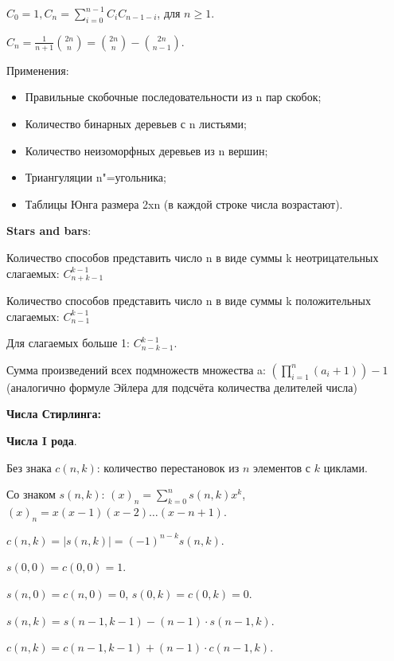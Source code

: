 $C_0 = 1, C_n = \sum_{i=0}^{n-1}C_i C_{n-1-i}$, для $n \ge 1$.

$C_n = \frac{1}{n+1}\binom{2n}{n} = \binom{2n}{n} - \binom{2n}{n - 1}$.

Применения:
\begin{itemize}
	\item Правильные скобочные последовательности из n пар скобок;
	\item Количество бинарных деревьев с n листьями;
	\item Количество неизоморфных деревьев из n вершин;
	\item Триангуляции n"=угольника;
	\item Таблицы Юнга размера 2xn (в каждой строке числа возрастают).
\end{itemize}
\textbf{Stars and bars}:

Количество способов представить число n в виде суммы k неотрицательных слагаемых: $C_{n + k - 1}^{k - 1} $

Количество способов представить число n в виде суммы k положительных слагаемых: $C_{n - 1}^{k - 1} $

Для слагаемых больше 1: $C_{n - k - 1}^{k - 1}$. 

Сумма произведений всех подмножеств множества a: $(\prod_{i=1}^{n} (a_i + 1)) - 1$ (аналогично формуле Эйлера для подсчёта количества делителей числа)

\textbf{Числа Стирлинга:}


\textbf{Числа I рода}.

Без знака $c(n,k)$: количество перестановок из $n$ элементов с $k$ циклами.

Со знаком $s(n,k)$: $(x)_n = \sum_{k=0}^n s(n,k)x^k$, $(x)_n = x(x-1)(x-2)\dots(x-n+1)$.

$c(n, k) = |s(n,k)| = (-1)^{n-k}s(n,k)$.

$s(0,0)=c(0,0)=1$.

$s(n,0)=c(n,0)=0$, $s(0,k)=c(0,k)=0$.

$s(n,k) = s(n-1,k-1) - (n-1) \cdot s(n-1,k)$.

$c(n,k) = c(n-1,k-1) + (n-1) \cdot c(n-1,k)$.

